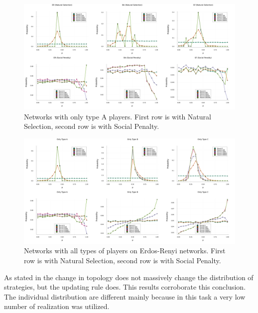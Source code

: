 \begin{figure}[H]
    \centering
    \includegraphics[width=1\textwidth]{images/Task34/TypeA_AllGraphs_AllRules.png}
    \caption{Networks with only type A players. First row is with Natural Selection, second row is with Social Penalty.}
\end{figure}

\begin{figure}[H]
    \centering
    \includegraphics[width=1\textwidth]{images/Task34/AllTypes_Erdos_AllRules.png}
    \caption{Networks with all types of players on Erdos-Renyi networks. First row is with Natural Selection, second row is with Social Penalty.}
\end{figure}

As stated in \cite{UltimatumGame} the change in topology does not massively change the distribution of strategies, but the updating rule does.
This results corroborate this conclusion. The individual distribution are different mainly because in this task a very low number of realization was utilized.
\newpage